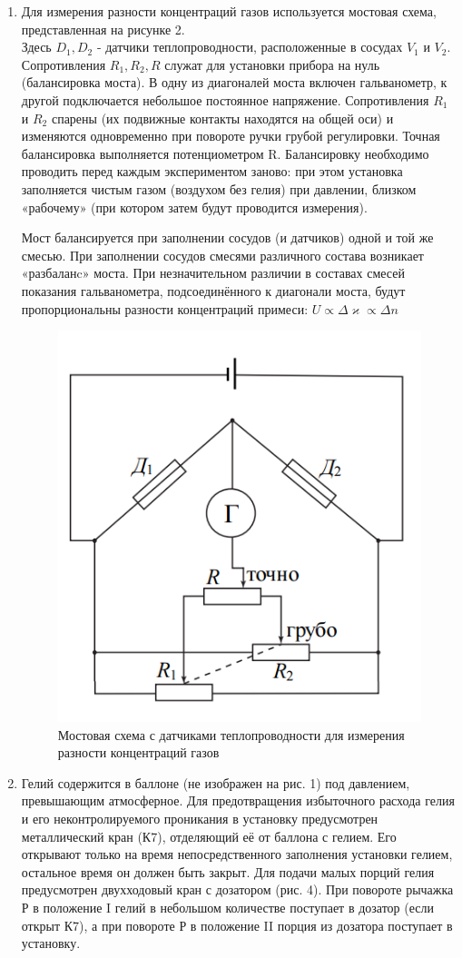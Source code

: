 \documentclass[12pt,a4paper]{article}
\begin{document}
\begin{enumerate}
\item Для измерения разности концентраций газов используется мостовая схема, представленная на рисунке 2. \\
Здесь $D_1, D_2$ - датчики теплопроводности, расположенные в сосудах $V_1$ и $V_2$. Сопротивления $R_1, R_2, R$ служат для установки прибора на нуль (балансировка моста). В одну из диагоналей моста включен гальванометр, к другой подключается небольшое постоянное напряжение. Сопротивления $R_1$ и $R_2$ спарены (их подвижные контакты находятся на общей оси) и изменяются одновременно при повороте ручки грубой регулировки. Точная балансировка выполняется потенциометром R. Балансировку необходимо проводить перед каждым экспериментом заново: при этом установка заполняется чистым газом (воздухом без гелия) при давлении, близком «рабочему» (при котором затем будут проводится измерения).

 Мост балансируется при заполнении сосудов (и датчиков) одной и той же смесью. При заполнении сосудов смесями различного состава возникает «разбаланc» моста. При незначительном различии в составах смесей показания гальванометра, подсоединённого к диагонали моста, будут пропорциональны разности концентраций примеси: $U \propto \Delta \varkappa \propto \Delta n$
 
\begin{figure}[h]
    \centering
    \includegraphics[width=5.5 cm]{scheme.PNG}
    \caption{Мостовая схема с датчиками теплопроводности для измерения разности концентраций газов}
    \label{fig:vac}
\end{figure} 

\item Гелий содержится в баллоне (не изображен на рис. 1) под давлением, превышающим атмосферное. Для предотвращения избыточного расхода гелия и
его неконтролируемого проникания в установку предусмотрен металлический кран (К7), отделяющий её от баллона с гелием. Его открывают только на
время непосредственного заполнения установки гелием, остальное время он должен быть закрыт. Для подачи малых порций гелия предусмотрен двухходовый кран с дозатором (рис. 4). При повороте рычажка Р в положение I гелий в небольшом количестве поступает в дозатор (если открыт К7), а при повороте Р в положение II порция из дозатора поступает в установку.


\end{enumerate}
\end{document}
